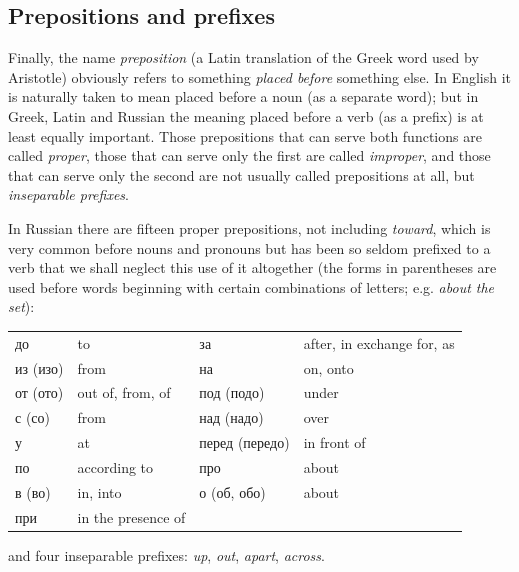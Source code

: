 \subsection*{Prepositions and prefixes}
Finally, the name \emph{preposition} (a Latin translation of the Greek word used by Aristotle) obviously refers to something \emph{placed before} something else. In English it is naturally taken to mean placed before a noun (as a separate word); but in Greek, Latin and Russian the meaning placed before a verb (as a prefix) is at least equally important. Those prepositions that can serve both functions are called \emph{proper}, those that can serve only the first are called \emph{improper}, and those that can serve only the second are not usually called prepositions at all, but \emph{inseparable prefixes}.

In Russian there are fifteen proper prepositions, not including  \emph{toward}, which is very common before nouns and pronouns but has been so seldom prefixed to a verb that we shall neglect this use of it altogether (the forms in parentheses are used before words beginning with certain combinations of letters; e.g.  \emph{about the set}):
\begin{center}
\small
\begin{tabular}{@{}>{\cyrillicfont}l l >{\cyrillicfont}l l@{}}
до & to & за & after, in exchange for, as\\
из (изо) & from & на & on, onto\\
от (ото) & out of, from, of & под (подо) & under\\
с (со) & from & над (надо) & over\\
у & at & перед (передо) & in front of\\
по & according to & про & about\\
в (во) & in, into & о (об, обо) & about\\
при & in the presence of & &
\end{tabular}
\end{center}
and four inseparable prefixes:  \emph{up},  \emph{out},  \emph{apart},  \emph{across}.

